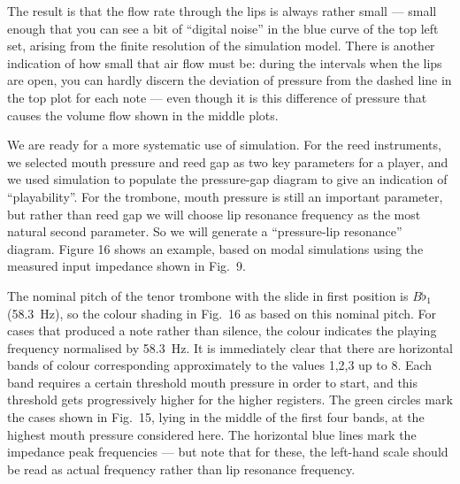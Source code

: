   The result is that the flow rate through the lips is always rather small — 
  small enough that you can see a bit of “digital noise” in the blue curve of 
  the top left set, arising from the finite resolution of the simulation model. 
  There is another indication of how small that air flow must be: during the 
  intervals when the lips are open, you can hardly discern the deviation of 
  pressure from the dashed line in the top plot for each note --- even though 
  it is this difference of pressure that causes the volume flow shown in the 
  middle plots. 

  We are ready for a more systematic use of simulation. For the reed 
  instruments, we selected mouth pressure and reed gap as two key parameters 
  for a player, and we used simulation to populate the pressure-gap diagram to 
  give an indication of “playability”. For the trombone, mouth pressure is 
  still an important parameter, but rather than reed gap we will choose lip 
  resonance frequency as the most natural second parameter. So we will generate 
  a “pressure-lip resonance” diagram. Figure 16 shows an example, based on 
  modal simulations using the measured input impedance shown in Fig.\ 9. 


  The nominal pitch of the tenor trombone with the slide in first position is 
  $B\flat_1$ (58.3~Hz), so the colour shading in Fig.\ 16 as based on this 
  nominal pitch. For cases that produced a note rather than silence, the colour 
  indicates the playing frequency normalised by 58.3~Hz. It is immediately 
  clear that there are horizontal bands of colour corresponding approximately 
  to the values 1,2,3 up to 8. Each band requires a certain threshold mouth 
  pressure in order to start, and this threshold gets progressively higher for 
  the higher registers. The green circles mark the cases shown in Fig.\ 15, 
  lying in the middle of the first four bands, at the highest mouth pressure 
  considered here. The horizontal blue lines mark the impedance peak 
  frequencies --- but note that for these, the left-hand scale should be read 
  as actual frequency rather than lip resonance frequency. 

